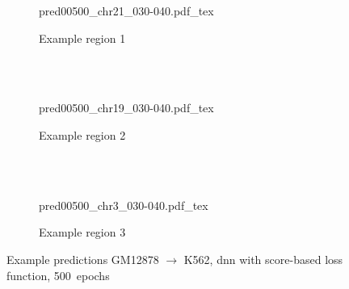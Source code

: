 \begin{figure}[p] %
    \begin{subfigure}{\textwidth}
        \centering
        \scriptsize
        {pred00500_chr21_030-040.pdf_tex}
        \caption{Example  region 1} \label{fig:results:scoreloss_r1}
    \end{subfigure}\\[2mm]
    \\[3mm]
    \begin{subfigure}{\textwidth}
        \centering
        \scriptsize
        {pred00500_chr19_030-040.pdf_tex}
        \caption{Example region 2} \label{fig:results:scoreloss_r2}
    \end{subfigure}\\[2mm]
    \\[3mm]
    \begin{subfigure}{\textwidth}
        \centering
        \scriptsize
        {pred00500_chr3_030-040.pdf_tex}
        \caption{Example region 3} \label{fig:results:scoreloss_r3}
    \end{subfigure}
    \caption{Example predictions GM12878 $\rightarrow$ K562,  \acrshort{dnn} with score-based loss function, 500~epochs} \label{fig:results:scoreloss_matrices}
\end{figure}

